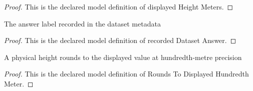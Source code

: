 \begin{proof}
  This is the declared model definition of displayed Height Meters.
\end{proof}
\begin{definition}
  \label{def:physics:phyx-mini-0334:phyxminiproblems-problemphyxmini0334-recordeddatasetanswer}
  The answer label recorded in the dataset metadata
\end{definition}
\begin{proof}
  This is the declared model definition of recorded Dataset Answer.
\end{proof}
\begin{definition}
  \label{def:physics:phyx-mini-0334:phyxminiproblems-problemphyxmini0334-roundstodisplayedhundredthmeter}
  A physical height rounds to the displayed value at hundredth-metre precision
\end{definition}
\begin{proof}
  This is the declared model definition of Rounds To Displayed Hundredth Meter.
\end{proof}
